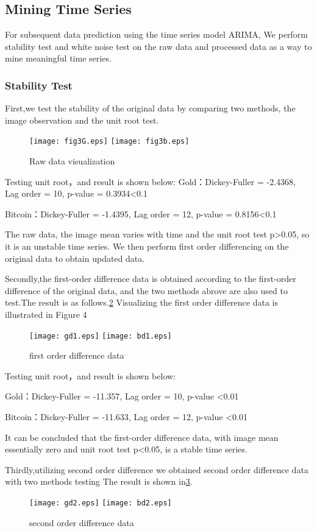 \documentclass{mcmthesis}
\begin{document}
\subsection{Mining Time Series}
For subsequent data prediction using the time series model ARIMA,
We perform stability test and white noise test on the raw data and processed data as a way to mine meaningful time series.


\subsubsection{Stability Test}
First,we test the stability of the original data by comparing two methods, the image observation and the unit root test.
\begin{figure}[!hb]
  \centering 
  \texttt{[image: fig3G.eps]}
  \texttt{[image: fig3b.eps]}
  \caption{Raw data visualization} \label{fig3}
\end{figure}
Testing unit root，and result is shown below:
Gold：Dickey-Fuller = -2.4368, Lag order = 10, p-value = 0.3934<0.1

Bitcoin：Dickey-Fuller = -1.4395, Lag order = 12, p-value = 0.8156<0.1

The raw data, the image mean varies with time and the unit root test p>0.05, so it is an unstable time series.
We then perform first order differencing on the original data to obtain updated data.


Secondly,the first-order difference data is obtained according to the first-order difference of the original data, 
and the two methods abrove are also used to test.The result is as follows.\ref{fig4}
Visualizing the first order difference data is illustrated in Figure 4
\begin{figure}[!hb]
  \centering 
  \texttt{[image: gd1.eps]}
  \texttt{[image: bd1.eps]}
  \caption{first order difference data} \label{fig4}
\end{figure}

Testing unit root，and result is shown below:

Gold：Dickey-Fuller = -11.357, Lag order = 10, p-value <0.01

Bitcoin：Dickey-Fuller = -11.633, Lag order = 12, p-value <0.01

It can be concluded that the first-order difference data, with image mean essentially zero and unit root test p<0.05, is a stable time series.


Thirdly,utilizing second order difference we obtained second order difference data with two methods testing
The result is shown in\ref{fig5}.
\begin{figure}[!h]
  \centering 
  \texttt{[image: gd2.eps]}
  \texttt{[image: bd2.eps]}
  \caption{second order difference data} \label{fig5}
\end{figure}
\end{document}
